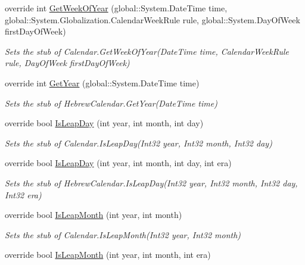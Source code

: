 \begin{DoxyCompactItemize}
override int \hyperlink{class_system_1_1_globalization_1_1_fakes_1_1_stub_hebrew_calendar_a2430381d9c1ffd81d16aca019b5c2b40}{Get\-Week\-Of\-Year} (global\-::\-System.\-Date\-Time time, global\-::\-System.\-Globalization.\-Calendar\-Week\-Rule rule, global\-::\-System.\-Day\-Of\-Week first\-Day\-Of\-Week)
\begin{DoxyCompactList}\small\item\em Sets the stub of Calendar.\-Get\-Week\-Of\-Year(\-Date\-Time time, Calendar\-Week\-Rule rule, Day\-Of\-Week first\-Day\-Of\-Week)\end{DoxyCompactList}\item 
override int \hyperlink{class_system_1_1_globalization_1_1_fakes_1_1_stub_hebrew_calendar_ad7092a5736b0a55830425e0f53b73f74}{Get\-Year} (global\-::\-System.\-Date\-Time time)
\begin{DoxyCompactList}\small\item\em Sets the stub of Hebrew\-Calendar.\-Get\-Year(\-Date\-Time time)\end{DoxyCompactList}\item 
override bool \hyperlink{class_system_1_1_globalization_1_1_fakes_1_1_stub_hebrew_calendar_af181d2662982f002872ae2c4d2825ef4}{Is\-Leap\-Day} (int year, int month, int day)
\begin{DoxyCompactList}\small\item\em Sets the stub of Calendar.\-Is\-Leap\-Day(\-Int32 year, Int32 month, Int32 day)\end{DoxyCompactList}\item 
override bool \hyperlink{class_system_1_1_globalization_1_1_fakes_1_1_stub_hebrew_calendar_ad98de05802d1998ae8308ca019d4ff64}{Is\-Leap\-Day} (int year, int month, int day, int era)
\begin{DoxyCompactList}\small\item\em Sets the stub of Hebrew\-Calendar.\-Is\-Leap\-Day(\-Int32 year, Int32 month, Int32 day, Int32 era)\end{DoxyCompactList}\item 
override bool \hyperlink{class_system_1_1_globalization_1_1_fakes_1_1_stub_hebrew_calendar_a423b9ccec540d71b78a977649aa0c29d}{Is\-Leap\-Month} (int year, int month)
\begin{DoxyCompactList}\small\item\em Sets the stub of Calendar.\-Is\-Leap\-Month(\-Int32 year, Int32 month)\end{DoxyCompactList}\item 
override bool \hyperlink{class_system_1_1_globalization_1_1_fakes_1_1_stub_hebrew_calendar_a8939d2913369d85beec5a468fef4256c}{Is\-Leap\-Month} (int year, int month, int era)

\end{DoxyCompactItemize}
